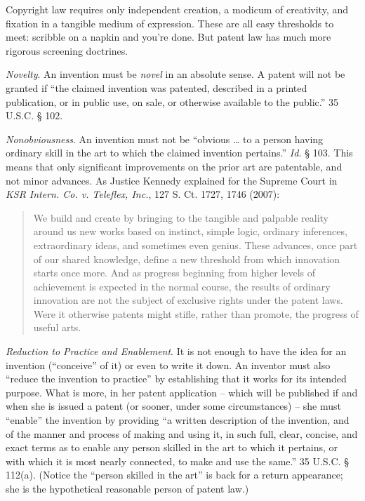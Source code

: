 \item Copyright law requires only independent creation, a modicum of creativity,
and fixation in a tangible medium of expression. These are all easy thresholds
to meet: scribble on a napkin and you're done. But patent law has much more
rigorous screening doctrines. 

\textit{Novelty}.\textit{ }An invention must be \textit{novel} in an absolute
sense. A patent will not be granted if ``the claimed invention was patented,
described in a printed publication, or in public use, on sale, or otherwise
available to the public.'' 35 U.S.C. {\S} 102.

\textit{Nonobviousness}. An invention must not be ``obvious {\dots} to a person
having ordinary skill in the art to which the claimed invention pertains.''
\textit{Id. }{\S} 103. This means that only significant improvements on the
prior art are patentable, and not minor advances. As Justice Kennedy explained
for the Supreme Court in \textit{KSR Intern. Co. v. Teleflex, Inc.}, 127 S. Ct.
1727, 1746 (2007):
\begin{quote}
We build and create by bringing to the tangible and palpable reality around us
new works based on instinct, simple logic, ordinary inferences, extraordinary
ideas, and sometimes even genius. These advances, once part of our shared
knowledge, define a new threshold from which innovation starts once more. And
as progress beginning from higher levels of achievement is expected in the
normal course, the results of ordinary innovation are not the subject of
exclusive rights under the patent laws. Were it otherwise patents might stifle,
rather than promote, the progress of useful arts.
\end{quote}

\textit{Reduction to Practice and Enablement}. It is not enough to have the idea
for an invention (``conceive'' of it) or even to write it down. An inventor
must also ``reduce the invention to practice'' by establishing that it works
for its intended purpose. What is more, in her patent application -- which will
be published if and when she is issued a patent (or sooner, under some
circumstances) -- she must ``enable'' the invention by providing ``a written
description of the invention, and of the manner and process of making and using
it, in such full, clear, concise, and exact terms as to enable any person
skilled in the art to which it pertains, or with which it is most nearly
connected, to make and use the same.'' 35 U.S.C. {\S} 112(a). (Notice the
``person skilled in the art'' is back for a return appearance; she is the
hypothetical reasonable person of patent law.)

